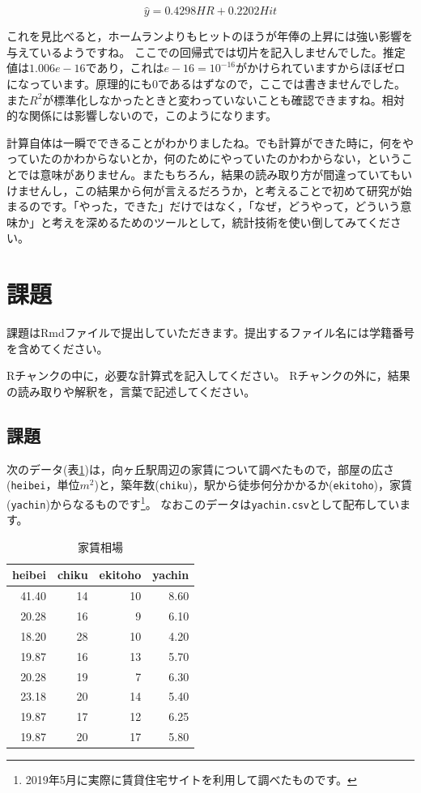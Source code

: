 \documentclass{ltjbook}
\begin{document}
\[ \hat{y} = 0.4298 HR + 0.2202 Hit \]

これを見比べると，ホームランよりもヒットのほうが年俸の上昇には強い影響を与えているようですね。
ここでの回帰式では切片を記入しませんでした。推定値は$1.006e-16$であり，これは$e-16=10^{-16}$がかけられていますからほぼゼロになっています。原理的にも$0$であるはずなので，ここでは書きませんでした。
また$R^2$が標準化しなかったときと変わっていないことも確認できますね。相対的な関係には影響しないので，このようになります。

計算自体は一瞬でできることがわかりましたね。でも計算ができた時に，何をやっていたのかわからないとか，何のためにやっていたのかわからない，ということでは意味がありません。またもちろん，結果の読み取り方が間違っていてもいけませんし，この結果から何が言えるだろうか，と考えることで初めて研究が始まるのです。「やった，できた」だけではなく，「なぜ，どうやって，どういう意味か」と考えを深めるためのツールとして，統計技術を使い倒してみてください。

\section{課題}
課題はRmdファイルで提出していただきます。提出するファイル名には学籍番号を含めてください。

Rチャンクの中に，必要な計算式を記入してください。
Rチャンクの外に，結果の読み取りや解釈を，言葉で記述してください。



\subsection{課題}
次のデータ(表\ref{tbl::ex11_01})は，向ヶ丘駅周辺の家賃について調べたもので，部屋の広さ(\verb|heibei|，単位$m^2$)と，築年数(\verb|chiku|)，駅から徒歩何分かかるか(\verb|ekitoho|)，家賃(\verb|yachin|)からなるものです\footnote{2019年5月に実際に賃貸住宅サイトを利用して調べたものです。}。
なおこのデータは\texttt{yachin.csv}として配布しています。
\begin{table}[ht]
	\caption{家賃相場}
	\centering
	\begin{tabular}[t]{rrrr}
		\hline
		heibei & chiku & ekitoho & yachin \\
		\hline
		41.40  & 14    & 10      & 8.60   \\
		20.28  & 16    & 9       & 6.10   \\
		18.20  & 28    & 10      & 4.20   \\
		19.87  & 16    & 13      & 5.70   \\
		20.28  & 19    & 7       & 6.30   \\
		23.18  & 20    & 14      & 5.40   \\
		19.87  & 17    & 12      & 6.25   \\
		19.87  & 20    & 17      & 5.80   \\
		\hline
	\end{tabular}
	\label{tbl::ex11_01}
\end{table}
\end{document}
